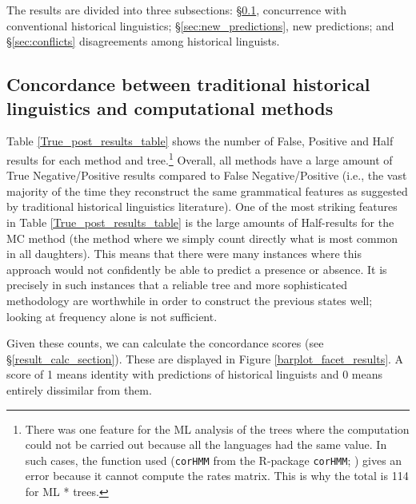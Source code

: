 \documentclass[12pt,letterpaper]{article}
\begin{document}
The results are divided into three subsections: §\ref{sec:results_concorance}, concurrence with conventional historical linguistics; §\ref{sec:new_predictions}, new predictions; and §\ref{sec:conflicts} disagreements among historical linguists.

\subsection{Concordance between traditional historical linguistics and computational methods}
\label{sec:results_concorance}




Table \ref{True_post_results_table} shows the number of False, Positive and Half results for each method and tree.\footnote{There was one feature for the ML analysis of the \citet{grayetal_2009} trees where the computation could not be carried out because all the languages had the same value. In such cases, the function used (\texttt{corHMM} from the R-package \texttt{corHMM}; \citealt{R-corHMM}) gives an error because it cannot compute the rates matrix. This is why the total is 114 for ML * \citet{grayetal_2009} trees.} Overall, all methods have a large amount of True Negative/Positive results compared to False Negative/Positive (i.e., the vast majority of the time they reconstruct the same grammatical features as suggested by traditional historical linguistics literature). One of the most striking features in Table \ref{True_post_results_table} is the large amounts of Half-results for the MC method (the method where we simply count directly what is most common in all daughters). This means that there were many instances where this approach would not confidently be able to predict a presence or absence. It is precisely in such instances that a reliable tree and more sophisticated methodology are worthwhile in order to construct the previous states well; looking at frequency alone is not sufficient.



Given these counts, we can calculate the concordance scores (see §\ref{result_calc_section}). These are displayed in Figure \ref{barplot_facet_results}. A score of 1 means identity with predictions of historical linguists and 0 means entirely dissimilar from them.
\end{document}

